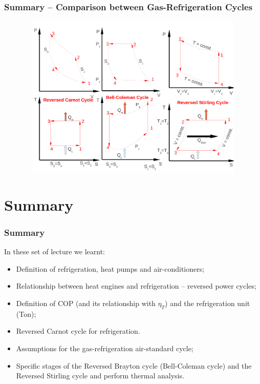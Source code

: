 \documentclass[10pt,compress]{beamer}
\begin{document}
\begin{frame}
 \frametitle{Summary -- Comparison between Gas-Refrigeration Cycles}

    \begin{figure}%
     \begin{center}
      \includegraphics[width=11.5cm,height=7.8cm]{./Pics/Overview_Refrig10}
     \end{center}
    \end{figure}  

\end{frame}




\section{Summary}
\begin{frame}
 \frametitle{Summary}
In these set of lecture we learnt: 
 \begin{itemize}
  \item <1-> Definition of refrigeration, heat pumps and air-conditioners;
  \item <2-> Relationship between heat engines and refrigeration -- reversed power cycles;
  \item <3-> Definition of COP (and its relationship with $\eta_{T}$) and the refrigeration unit (Ton);
  \item <4-> Reversed Carnot cycle for refrigeration.
  \item <5-> Assumptions for the gas-refrigeration air-standard cycle;
  \item <6-> Specific stages of the Reversed Brayton cycle (Bell-Coleman cycle) and the Reversed Stirling cycle and perform thermal analysis.
 \end{itemize}
\end{frame}
\end{document}
